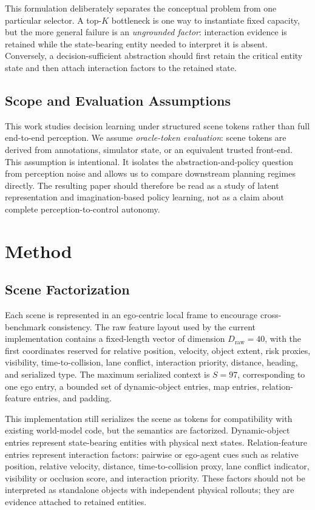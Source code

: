 \documentclass[journal]{IEEEtran}
\begin{document}
This formulation deliberately separates the conceptual problem from one particular selector. A top-$K$ bottleneck is one way to instantiate fixed capacity, but the more general failure is an \emph{ungrounded factor}: interaction evidence is retained while the state-bearing entity needed to interpret it is absent. Conversely, a decision-sufficient abstraction should first retain the critical entity state and then attach interaction factors to the retained state.

\subsection{Scope and Evaluation Assumptions}
This work studies decision learning under structured scene tokens rather than full end-to-end perception. We assume \emph{oracle-token evaluation}: scene tokens are derived from annotations, simulator state, or an equivalent trusted front-end. This assumption is intentional. It isolates the abstraction-and-policy question from perception noise and allows us to compare downstream planning regimes directly. The resulting paper should therefore be read as a study of latent representation and imagination-based policy learning, not as a claim about complete perception-to-control autonomy.

\section{Method}
\subsection{Scene Factorization}
Each scene is represented in an ego-centric local frame to encourage cross-benchmark consistency. The raw feature layout used by the current implementation contains a fixed-length vector of dimension $D_{\mathrm{raw}}=40$, with the first coordinates reserved for relative position, velocity, object extent, risk proxies, visibility, time-to-collision, lane conflict, interaction priority, distance, heading, and serialized type. The maximum serialized context is $S=97$, corresponding to one ego entry, a bounded set of dynamic-object entries, map entries, relation-feature entries, and padding.

This implementation still serializes the scene as tokens for compatibility with existing world-model code, but the semantics are factorized. Dynamic-object entries represent state-bearing entities with physical next states. Relation-feature entries represent interaction factors: pairwise or ego-agent cues such as relative position, relative velocity, distance, time-to-collision proxy, lane conflict indicator, visibility or occlusion score, and interaction priority. These factors should not be interpreted as standalone objects with independent physical rollouts; they are evidence attached to retained entities.
\end{document}
